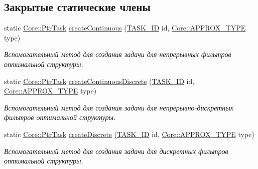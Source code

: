 \subsection*{Закрытые статические члены}
\begin{DoxyCompactItemize}
\item 
\hypertarget{class_tasks_1_1_task_factory_aa8c79efba82e51c6cf6e75b8cdb94066}{}\label{class_tasks_1_1_task_factory_aa8c79efba82e51c6cf6e75b8cdb94066} 
static \hyperlink{namespace_core_abfda8f69fcacfcea2696549b548ed737}{Core\+::\+Ptr\+Task} \hyperlink{class_tasks_1_1_task_factory_aa8c79efba82e51c6cf6e75b8cdb94066}{create\+Continuous} (\hyperlink{namespace_tasks_acf6b541f8ce51b63eb9fcb8748317707}{T\+A\+S\+K\+\_\+\+ID} id, \hyperlink{namespace_core_acd67f53ff1d9b21fabb1da4474a8f7d9}{Core\+::\+A\+P\+P\+R\+O\+X\+\_\+\+T\+Y\+PE} type)
\begin{DoxyCompactList}\small\item\em Вспомогательный метод для создания задачи для непрерывных фильтров оптимальной структуры. \end{DoxyCompactList}\item 
\hypertarget{class_tasks_1_1_task_factory_a35acfe104a777f69cbcd17a1b4be2fb4}{}\label{class_tasks_1_1_task_factory_a35acfe104a777f69cbcd17a1b4be2fb4} 
static \hyperlink{namespace_core_abfda8f69fcacfcea2696549b548ed737}{Core\+::\+Ptr\+Task} \hyperlink{class_tasks_1_1_task_factory_a35acfe104a777f69cbcd17a1b4be2fb4}{create\+Continuous\+Discrete} (\hyperlink{namespace_tasks_acf6b541f8ce51b63eb9fcb8748317707}{T\+A\+S\+K\+\_\+\+ID} id, \hyperlink{namespace_core_acd67f53ff1d9b21fabb1da4474a8f7d9}{Core\+::\+A\+P\+P\+R\+O\+X\+\_\+\+T\+Y\+PE} type)
\begin{DoxyCompactList}\small\item\em Вспомогательный метод для создания задачи для непрерывно-\/дискретных фильтров оптимальной структуры. \end{DoxyCompactList}\item 
\hypertarget{class_tasks_1_1_task_factory_a54d4fc408cce16975ea718928af92988}{}\label{class_tasks_1_1_task_factory_a54d4fc408cce16975ea718928af92988} 
static \hyperlink{namespace_core_abfda8f69fcacfcea2696549b548ed737}{Core\+::\+Ptr\+Task} \hyperlink{class_tasks_1_1_task_factory_a54d4fc408cce16975ea718928af92988}{create\+Discrete} (\hyperlink{namespace_tasks_acf6b541f8ce51b63eb9fcb8748317707}{T\+A\+S\+K\+\_\+\+ID} id, \hyperlink{namespace_core_acd67f53ff1d9b21fabb1da4474a8f7d9}{Core\+::\+A\+P\+P\+R\+O\+X\+\_\+\+T\+Y\+PE} type)
\begin{DoxyCompactList}\small\item\em Вспомогательный метод для создания задачи для дискретных фильтров оптимальной структуры. \end{DoxyCompactList}\end{DoxyCompactItemize}


